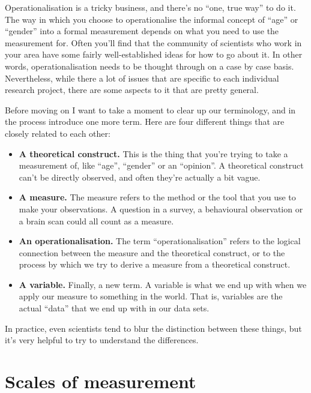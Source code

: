\documentclass[
]{book}
\providecommand{\tightlist}{%
  \setlength{\itemsep}{0pt}\setlength{\parskip}{0pt}}
\begin{document}
Operationalisation is a tricky business, and there's no ``one, true way'' to do it. The way in which you choose to operationalise the informal concept of ``age'' or ``gender'' into a formal measurement depends on what you need to use the measurement for. Often you'll find that the community of scientists who work in your area have some fairly well-established ideas for how to go about it. In other words, operationalisation needs to be thought through on a case by case basis. Nevertheless, while there a lot of issues that are specific to each individual research project, there are some aspects to it that are pretty general.

Before moving on I want to take a moment to clear up our terminology, and in the process introduce one more term. Here are four different things that are closely related to each other:

\begin{itemize}
\tightlist
\item
  \textbf{A theoretical construct.} This is the thing that you're trying to take a measurement of, like ``age'', ``gender'' or an ``opinion''. A theoretical construct can't be directly observed, and often they're actually a bit vague.
\item
  \textbf{A measure.} The measure refers to the method or the tool that you use to make your observations. A question in a survey, a behavioural observation or a brain scan could all count as a measure.
\item
  \textbf{An operationalisation.} The term ``operationalisation'' refers to the logical connection between the measure and the theoretical construct, or to the process by which we try to derive a measure from a theoretical construct.
\item
  \textbf{A variable.} Finally, a new term. A variable is what we end up with when we apply our measure to something in the world. That is, variables are the actual ``data'' that we end up with in our data sets.
\end{itemize}

In practice, even scientists tend to blur the distinction between these things, but it's very helpful to try to understand the differences.

\hypertarget{scales-of-measurement}{%
\section{Scales of measurement}\label{scales-of-measurement}}
\end{document}
